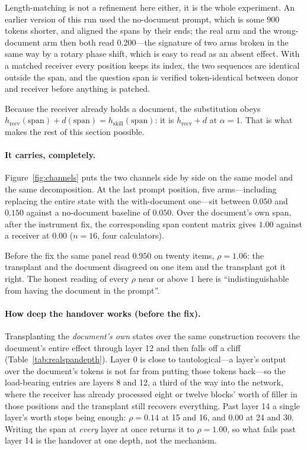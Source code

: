 \documentclass{article}
\newcommand{\dvec}{\ensuremath{d}}
\begin{document}
Length-matching is not a refinement here either, it is the whole experiment. An
earlier version of this run used the no-document
prompt, which is some $900$ tokens shorter, and aligned the spans by their ends;
the real arm and the wrong-document arm then both read $0.200$---the signature
of two arms broken in the same way by a rotary phase shift, which is easy to
read as an absent effect. With a matched receiver every position keeps its
index, the two sequences are identical outside the span, and the question span
is verified token-identical between donor and receiver before anything is
patched.

Because the receiver already holds a document, the substitution obeys
$h_{\text{recv}}(\text{span}) + \dvec(\text{span}) = h_{\text{skill}}(\text{span})$: it is $h_{\text{recv}} + \dvec$ at $\alpha=1$. That is
what makes the rest of this section possible.

\paragraph{It carries, completely.} Figure~\ref{fig:channels} puts the two
channels side by side on the same model and the same decomposition. At the last
prompt position, five arms---including replacing the entire state with the
with-document one---sit between $0.050$ and $0.150$ against a no-document
baseline of $0.050$. Over the document's own span, after the instrument fix,
the corresponding span content matrix gives $1.00$ against a receiver at $0.00$ ($n=16$, four
calculators).

Before the fix the same panel read $0.950$ on twenty items, $\rho = 1.06$: the
transplant and the document disagreed on one item and the transplant got it
right. The honest reading of every $\rho$ near or above $1$ here is
``indistinguishable from having the document in the prompt''.



\paragraph{How deep the handover works (before the fix).} Transplanting the \emph{document's own}
states over the same construction recovers the document's entire effect through
layer 12 and then falls off a cliff (Table~\ref{tab:realspandepth}). Layer 0 is
close to tautological---a layer's output over the document's tokens is not far
from putting those tokens back---so the load-bearing entries are layers 8 and
12, a third of the way into
the network, where the receiver has already processed eight or twelve blocks'
worth of filler in those positions and the transplant still recovers
everything. Past layer 14 a single layer's worth stops being enough: $\rho =
0.14$ at 15 and 16, and $0.00$ at 24 and 30. Writing
the span at \emph{every} layer at once returns it to $\rho = 1.00$, so what
fails past layer 14 is the handover at one depth, not the mechanism.
\end{document}
